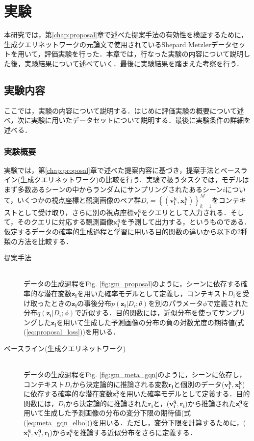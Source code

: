 \chapter{実験}
\label{chap:experiment}
本研究では，第\ref{chap:proposal}章で述べた提案手法の有効性を検証するために，生成クエリネットワークの元論文で使用されているShepard Metzlerデータセットを用いて，評価実験を行った．本章では，行なった実験の内容について説明した後，実験結果について述べていく．最後に実験結果を踏まえた考察を行う．

\section{実験内容}
ここでは，実験の内容について説明する．はじめに評価実験の概要について述べ，次に実験に用いたデータセットについて説明する．最後に実験条件の詳細を述べる．
\subsection{実験概要}
実験では，第\ref{chap:proposal}章で述べた提案内容に基づき，提案手法とベースライン(生成クエリネットワーク)の比較を行う．実験で扱うタスクでは，モデルはまず多数あるシーンの中からランダムにサンプリングされたあるシーン$i$について，いくつかの視点座標と観測画像のペア群$D_i = \left\{ \left( \bm{v _ { i } ^ { k }} , \bm{x _ { i } ^ { k }} \right) \right\} _ { k = 1 } ^ { M }$をコンテキストとして受け取り，さらに別の視点座標$\bm{v_i^q}$をクエリとして入力される．そして，そのクエリに対応する観測画像$\bm{x_i^q}$を予測して出力する，というものである．
仮定するデータの確率的生成過程と学習に用いる目的関数の違いから以下の2種類の方法を比較する．

\begin{description}
\item[提案手法]\mbox{}\\
データの生成過程をFig. \ref{fig:gm_proposal}のように，シーンに依存する確率的な潜在変数$\bm{z_i}$を用いた確率モデルとして定義し，コンテキスト$D_i$を受け取ったときの$\bm{z_i}$の事後分布$p(\bm{z_i} | D_i ; \theta)$を別のパラメータ$\phi$で定義された分布$q(\bm{z_i} | D_i ; \phi)$で近似する．目的関数には，近似分布を使ってサンプリングした$\bm{z_i}$を用いて生成した予測画像の分布の負の対数尤度の期待値(式(\ref{eq:proposal_loss}))を用いる．

\item[ベースライン(生成クエリネットワーク)]\mbox{}\\
データの生成過程をFig. \ref{fig:gm_meta_gqn}のように，シーンに依存し，コンテキスト$D_i$から決定論的に推論される変数$\bm{r_i}$と個別のデータ($\bm{v_i^k}, \bm{x_i^k}$)に依存する確率的な潜在変数$\bm{z_i^k}$を用いた確率モデルとして定義する．目的関数には，$D_i$から決定論的に推論された$\bm{r_i}$と，($\bm{v_i^q}, \bm{r_i}$)から推論された$\bm{z_i^q}$を用いて生成した予測画像の分布の変分下限の期待値(式(\ref{eq:meta_gqn_elbo}))を用いる．ただし，変分下限を計算するために，($\bm{x_i^q}, \bm{v_i^q}, \bm{r_i}$)から$\bm{z_i^q}$を推論する近似分布をさらに定義する．
\end{description}

